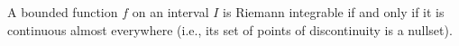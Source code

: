 A bounded function $f$ on an interval $I$ is Riemann integrable if and only if it is continuous almost everywhere (i.e., its set of points of discontinuity is a nullset).
